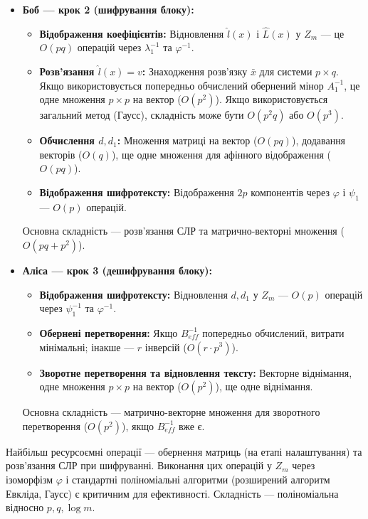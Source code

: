 \begin{itemize}
    \item \textbf{Боб — крок 2 (шифрування блоку):}
    \begin{itemize}
        \item \textbf{Відображення коефіцієнтів:} Відновлення $\hat{l}(x)$ і $\hat{L}(x)$ у $Z_m$ — це $O(pq)$ операцій через $\lambda_1^{-1}$ та $\varphi^{-1}$.
        \item \textbf{Розв'язання $\hat{l}(x)=v$:} Знаходження розв'язку $\bar{x}$ для системи $p \times q$. Якщо використовується попередньо обчислений обернений мінор $A_1^{-1}$, це одне множення $p \times p$ на вектор ($O(p^2)$). Якщо використовується загальний метод (Гаусс), складність може бути $O(p^2 q)$ або $O(p^3)$.
        \item \textbf{Обчислення $d, d_1$:} Множення матриці на вектор ($O(pq)$), додавання векторів ($O(q)$), ще одне множення для афінного відображення ($O(pq)$).
        \item \textbf{Відображення шифротексту:} Відображення $2p$ компонентів через $\varphi$ і $\psi_1$ — $O(p)$ операцій.
    \end{itemize}
    Основна складність — розв'язання СЛР та матрично-векторні множення ($O(pq + p^2)$).

    \item \textbf{Аліса — крок 3 (дешифрування блоку):}
    \begin{itemize}
        \item \textbf{Відображення шифротексту:} Відновлення $d, d_1$ у $Z_m$ — $O(p)$ операцій через $\psi_1^{-1}$ та $\varphi^{-1}$.
        \item \textbf{Обернені перетворення:} Якщо $B_{eff}^{-1}$ попередньо обчислений, витрати мінімальні; інакше — $r$ інверсій ($O(r \cdot p^3)$).
        \item \textbf{Зворотне перетворення та відновлення тексту:} Векторне віднімання, одне множення $p \times p$ на вектор ($O(p^2)$), ще одне віднімання.
    \end{itemize}
    Основна складність — матрично-векторне множення для зворотного перетворення ($O(p^2)$), якщо $B_{eff}^{-1}$ вже є.
\end{itemize}

Найбільш ресурсоємні операції — обернення матриць (на етапі налаштування) та розв'язання СЛР при шифруванні.
Виконання цих операцій у $Z_m$ через ізоморфізм $\varphi$ і стандартні поліноміальні алгоритми (розширений алгоритм Евкліда, Гаусс) є критичним для ефективності.
Складність — поліноміальна відносно $p, q, \log m$.

